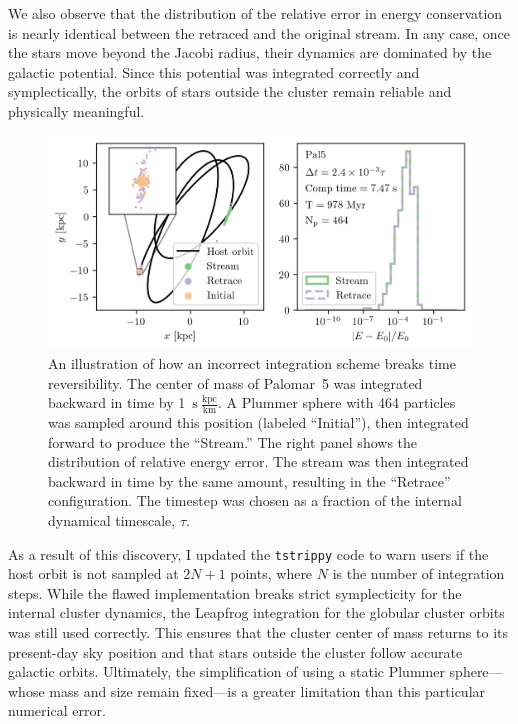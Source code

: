         We also observe that the distribution of the relative error in energy conservation is nearly identical between the retraced and the original stream. In any case, once the stars move beyond the Jacobi radius, their dynamics are dominated by the galactic potential. Since this potential was integrated correctly and symplectically, the orbits of stars outside the cluster remain reliable and physically meaningful.

        \begin{figure}
            \centering
            \includegraphics[width=\linewidth]{images/NumericalErrorStreamRetrace_Pal5_Nsteps_32768_stepsPerTau_420.png}
            \caption{An illustration of how an incorrect integration scheme breaks time reversibility. The center of mass of Palomar~5 was integrated backward in time by 1~$\mathrm{s}~\frac{\mathrm{kpc}}{\mathrm{km}}$. A Plummer sphere with 464 particles was sampled around this position (labeled “Initial”), then integrated forward to produce the “Stream.” The right panel shows the distribution of relative energy error. The stream was then integrated backward in time by the same amount, resulting in the “Retrace” configuration. The timestep was chosen as a fraction of the internal dynamical timescale, $\tau$.}
            \label{fig:NumericalErrorStreamRetrace_Pal5_Nsteps_32768_stepsPerTau_420}
        \end{figure}
        As a result of this discovery, I updated the \texttt{tstrippy} code to warn users if the host orbit is not sampled at $2N + 1$ points, where $N$ is the number of integration steps. While the flawed implementation breaks strict symplecticity for the internal cluster dynamics, the Leapfrog integration for the globular cluster orbits was still used correctly. This ensures that the cluster center of mass returns to its present-day sky position and that stars outside the cluster follow accurate galactic orbits. Ultimately, the simplification of using a static Plummer sphere—whose mass and size remain fixed—is a greater limitation than this particular numerical error.

